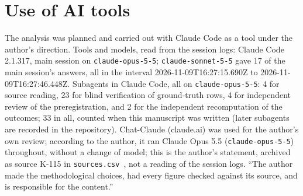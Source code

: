 \section{Use of AI tools}
\label{sec:ki}

The analysis was planned and carried out with Claude Code as a tool under the author's direction.
Tools and models, read from the session logs: Claude Code 2.1.317, main session on \texttt{claude-opus-5-5}; \texttt{claude-sonnet-5-5} gave 17 of the main session's answers, all in the interval 2026-11-09T16:27:15.690Z to 2026-11-09T16:27:46.448Z. %
Subagents in Claude Code, all on \texttt{claude-opus-5-5}: 4 for source reading, 23 for blind verification of ground-truth rows, 4 for independent review of the preregistration, and 2 for the independent recomputation of the outcomes; 33 in all, counted when this manuscript was written (later subagents are recorded in the repository). %
Chat-Claude (claude.ai) was used for the author's own review; according to the author, it ran Claude Opus 5.5 (\texttt{claude-opus-5-5}) throughout, without a change of model; this is the author's statement, archived as source K-115 in \texttt{sources.csv}~\cite{sources}, not a reading of the session logs. %
``The author made the methodological choices, had every figure checked against its source, and is responsible for the content.'' %

